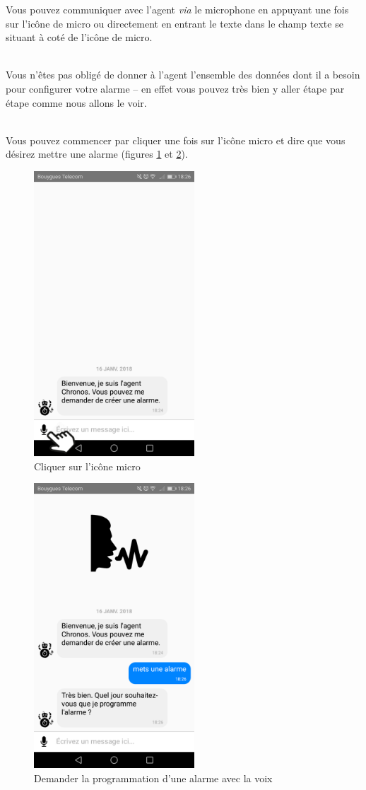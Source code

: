 Vous pouvez communiquer avec l'agent \emph{via} le microphone en appuyant une fois sur l'icône de micro
ou directement en entrant le texte dans le champ texte se situant à coté de l'icône de micro.

~\\\indent Vous n'êtes pas obligé de donner à l'agent l'ensemble des données
dont il a besoin pour configurer votre alarme \--- en effet vous pouvez très bien y aller étape par étape comme nous allons le voir.

~\\\indent Vous pouvez commencer par cliquer
une fois sur l'icône micro et dire que vous désirez mettre une alarme (figures \ref{B} et \ref{C}).

\begin{figure}[H]
  \centering
  \includegraphics[width=6cm]{images/B.png}
  \caption{Cliquer sur l'icône micro}
  \label{B}
\end{figure}

\begin{figure}[H]
  \centering
  \includegraphics[width=6cm]{images/C.png}
  \caption{Demander la programmation d'une alarme avec la voix}
  \label{C}
\end{figure}

